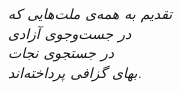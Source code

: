 \thispagestyle{empty}
\vspace*{6cm}
\begin{center}
  {\Large\itshape\color{PrimaryMid}
  تقدیم به همه‌ی ملت‌هایی که\\[8pt]
  در جست‌وجوی آزادی\\[8pt]
  در جستجوی نجات\\[12pt]
  بهای گزافی پرداخته‌اند.}
\end{center}
\vspace*{\fill}
\cleardoublepage
